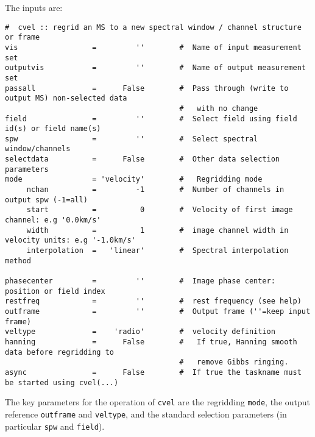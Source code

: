 {The inputs are:
\small
\begin{verbatim}
#  cvel :: regrid an MS to a new spectral window / channel structure or frame
vis                 =         ''        #  Name of input measurement set
outputvis           =         ''        #  Name of output measurement set
passall             =      False        #  Pass through (write to output MS) non-selected data
                                        #   with no change
field               =         ''        #  Select field using field id(s) or field name(s)
spw                 =         ''        #  Select spectral window/channels
selectdata          =      False        #  Other data selection parameters
mode                = 'velocity'        #   Regridding mode
     nchan          =         -1        #  Number of channels in output spw (-1=all)
     start          =          0        #  Velocity of first image channel: e.g '0.0km/s'
     width          =          1        #  image channel width in velocity units: e.g '-1.0km/s'
     interpolation  =   'linear'        #  Spectral interpolation method

phasecenter         =         ''        #  Image phase center: position or field index
restfreq            =         ''        #  rest frequency (see help)
outframe            =         ''        #  Output frame (''=keep input frame)
veltype             =    'radio'        #  velocity definition
hanning             =      False        #   If true, Hanning smooth data before regridding to
                                        #   remove Gibbs ringing.
async               =      False        #  If true the taskname must be started using cvel(...)

\end{verbatim}
\normalsize

The key parameters for the operation of {\tt cvel} are the regridding
{\tt mode}, the output reference {\tt outframe} and {\tt veltype}, and
the standard selection parameters (in particular {\tt spw} and {\tt field}).

}
